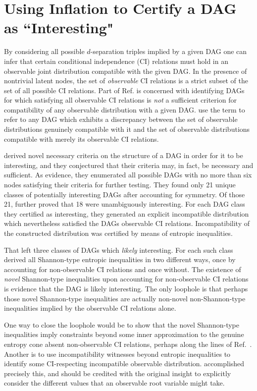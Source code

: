 \section{Using Inflation to Certify a DAG as ``Interesting"}
By considering all possible $d$-separation triples implied by a given DAG one can infer that certain conditional independence (CI) relations must hold in an observable joint distribution compatible with the given DAG. In the presence of nontrivial latent nodes, the set of \emph{observable} CI relations is a strict subset of the set of all possible CI relations. Part of Ref. \cite{pusey2014gdag} is concerned with identifying DAGs for which satisfying all observable CI relations is \emph{not} a sufficient criterion for compatibility of any observable distribution with a given DAG. \citet{pusey2014gdag} use the term  to refer to any DAG which exhibits a discrepancy between the set of observable distributions genuinely compatible with it and the set of observable distributions compatible with merely its observable CI relations.

\citet{pusey2014gdag} derived novel necessary criteria on the structure of a DAG in order for it to be interesting, and they conjectured that their criteria may, in fact, be necessary and sufficient. As evidence, they enumerated all possible DAGs with no more than six nodes satisfying their criteria for further testing. They found only 21 unique classes of potentially interesting DAGs after accounting for symmetry. Of those 21, \citet{pusey2014gdag} further proved that 18 were unambiguously interesting. For each DAG class they certified as interesting, they generated an explicit incompatible distribution which nevertheless satisfied the DAGs observable CI relations. Incompatibility of the constructed distribution was certified by means of entropic inequalities. 

That left three classes of DAGs which \emph{likely} interesting. For each such class \citet{pusey2014gdag} derived all Shannon-type entropic inequalities in two different ways, once by accounting for non-observable CI relations and once without. The existence of \emph{novel} Shannon-type inequalities upon accounting for non-observable CI relations is evidence that the DAG is likely interesting. The only loophole is that perhaps those novel Shannon-type inequalities are actually non-novel non-Shannon-type inequalities implied by the observable CI relations alone.

One way to close the loophole would be to show that the novel Shannon-type inequalities imply constraints beyond some inner approximation to the genuine entropy cone absent non-observable CI relations, perhaps along the lines of Ref.~\cite{weilenmann2016entropic}. Another is to use incompatibility witnesses beyond entropic inequalities to identify some CI-respecting incompatible observable distribution. \citet{piannaar2016interesting} accomplished precisely this, and should be credited with the original insight to explicitly consider the different values that an observable root variable might take. 

